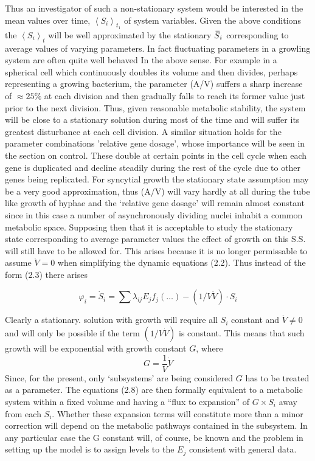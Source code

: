 Thus an investigator of such a non-stationary system would be interested in the mean values over time, $\left\langle S_{i}\right\rangle_{t_1}$ of system variables. Given the above conditions the $\left\langle S_{i}\right\rangle_{t}$ will be well approximated by the stationary $\,\overline{\!{S}}_{i}$ corresponding to average values of varying parameters. In fact fluctuating parameters in a growling system are often quite well behaved In the above sense. For example in a spherical cell which continuously doubles its volume and then divides, perhaps representing a growing bacterium, the parameter (A/V) suffers a sharp increase of $\approx 25 \%$ at each division and then gradually falls to reach its former value just prior to the next division. Thus, given reasonable metabolic stability, the system will be close to a stationary solution during most of the time and will suffer its greatest disturbance at each cell division. A similar situation holds for the parameter combinations 'relative gene dosage', whose importance will be seen in the section on control. These double at certain points in the cell cycle when each gene is duplicated and decline steadily during the rest of the cycle due to other genes being replicated. For syncytial growth the stationary state assumption may be a very good approximation, thus (A/V) will vary hardly at all during the tube like growth of hyphae and the `relative gene dosage' will remain almost constant since in this case a number of asynchronously dividing nuclei inhabit a common metabolic space. Supposing then that it is acceptable to study the stationary state corresponding to average parameter values the effect of growth on this S.S. will still have to be allowed for. This arises because it is no longer permissable to assume $\dot{V}=0$ when simplifying the dynamic equations (2.2). Thus instead of the form (2.3) there arises

\begin{equation}
\varphi_{i}=\dot{S}_{i}=\sum \lambda_{ij} E_{j} f_{j}(\ldots)-(1/V \dot{V}) \cdot S_{i}
\label{eqn:28}
\end{equation}

Clearly a stationary. solution with growth will require all $S_{i}$ constant and $\dot{V} \neq 0$ and will only be possible if the term $(1/V \dot{V})$ is constant. This means that such growth will be exponential with growth constant $G$, where
%
$$
G = \frac{1}{V} \dot{V}
$$
%
Since, for the present, only `subsystems' are being considered $G$ has to be treated as a parameter. The equations (2.8) are then formally equivalent to a metabolic system within a fixed volume and having a ``flux to expansion'' of $G \times S_{i}$ away from each $S_{i}$. Whether these expansion terms will constitute more than a minor correction will depend on the metabolic pathways contained in the subsystem. In any particular case the G constant will, of course, be known and the problem in setting up the model is to assign levels to the $E_{j}$ consistent with general data.

